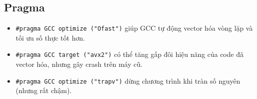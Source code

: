 	\subsection{Pragma}
		\begin{itemize}
			\item \lstinline{#pragma GCC optimize ("Ofast")} giúp GCC tự động vector hóa vòng lặp và tối ưu số thực tốt hơn.
			\item \lstinline{#pragma GCC target ("avx2")} có thể tăng gấp đôi hiệu năng của code đã vector hóa, nhưng gây crash trên máy cũ.
			\item \lstinline{#pragma GCC optimize ("trapv")} dừng chương trình khi tràn số nguyên (nhưng rất chậm).
		\end{itemize}
